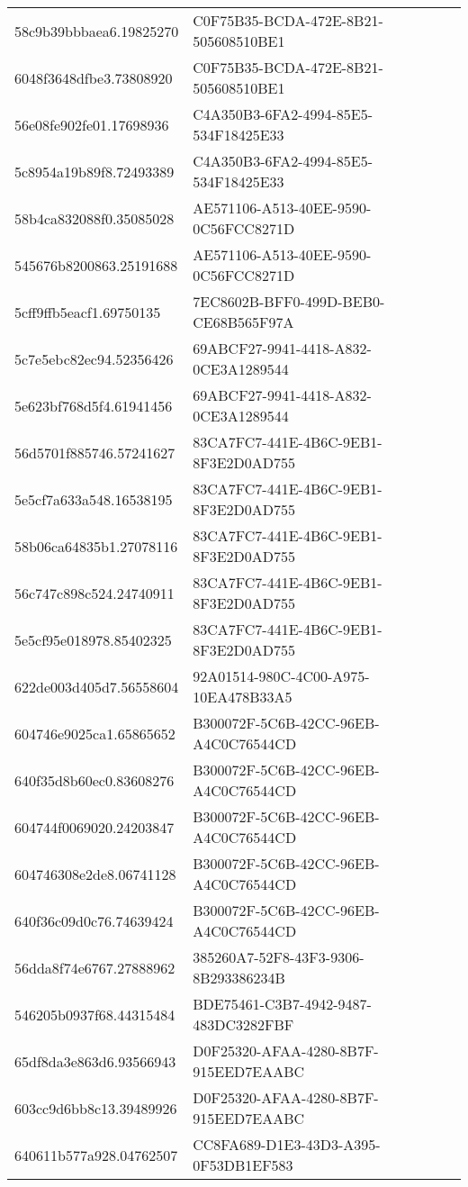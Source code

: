 \begin{tabular}{ll}
58c9b39bbbaea6.19825270 & C0F75B35-BCDA-472E-8B21-505608510BE1 \\
6048f3648dfbe3.73808920 & C0F75B35-BCDA-472E-8B21-505608510BE1 \\
56e08fe902fe01.17698936 & C4A350B3-6FA2-4994-85E5-534F18425E33 \\
5c8954a19b89f8.72493389 & C4A350B3-6FA2-4994-85E5-534F18425E33 \\
58b4ca832088f0.35085028 & AE571106-A513-40EE-9590-0C56FCC8271D \\
545676b8200863.25191688 & AE571106-A513-40EE-9590-0C56FCC8271D \\
5cff9ffb5eacf1.69750135 & 7EC8602B-BFF0-499D-BEB0-CE68B565F97A \\
5c7e5ebc82ec94.52356426 & 69ABCF27-9941-4418-A832-0CE3A1289544 \\
5e623bf768d5f4.61941456 & 69ABCF27-9941-4418-A832-0CE3A1289544 \\
56d5701f885746.57241627 & 83CA7FC7-441E-4B6C-9EB1-8F3E2D0AD755 \\
5e5cf7a633a548.16538195 & 83CA7FC7-441E-4B6C-9EB1-8F3E2D0AD755 \\
58b06ca64835b1.27078116 & 83CA7FC7-441E-4B6C-9EB1-8F3E2D0AD755 \\
56c747c898c524.24740911 & 83CA7FC7-441E-4B6C-9EB1-8F3E2D0AD755 \\
5e5cf95e018978.85402325 & 83CA7FC7-441E-4B6C-9EB1-8F3E2D0AD755 \\
622de003d405d7.56558604 & 92A01514-980C-4C00-A975-10EA478B33A5 \\
604746e9025ca1.65865652 & B300072F-5C6B-42CC-96EB-A4C0C76544CD \\
640f35d8b60ec0.83608276 & B300072F-5C6B-42CC-96EB-A4C0C76544CD \\
604744f0069020.24203847 & B300072F-5C6B-42CC-96EB-A4C0C76544CD \\
604746308e2de8.06741128 & B300072F-5C6B-42CC-96EB-A4C0C76544CD \\
640f36c09d0c76.74639424 & B300072F-5C6B-42CC-96EB-A4C0C76544CD \\
56dda8f74e6767.27888962 & 385260A7-52F8-43F3-9306-8B293386234B \\
546205b0937f68.44315484 & BDE75461-C3B7-4942-9487-483DC3282FBF \\
65df8da3e863d6.93566943 & D0F25320-AFAA-4280-8B7F-915EED7EAABC \\
603cc9d6bb8c13.39489926 & D0F25320-AFAA-4280-8B7F-915EED7EAABC \\
640611b577a928.04762507 & CC8FA689-D1E3-43D3-A395-0F53DB1EF583 \\

\end{tabular}
